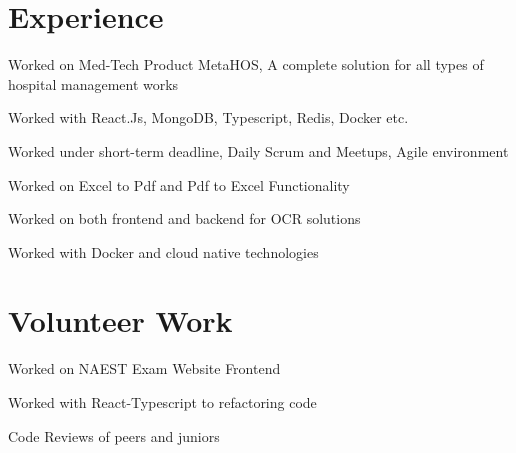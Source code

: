 \documentclass[]{deedy-resume-openfont}
\begin{document}
\begin{minipage}[t]{0.66\textwidth} 


\section{Experience}

\vspace{\topsep} 
\begin{tightemize}
\item Worked on Med-Tech Product MetaHOS, A complete solution for all types of hospital management works
\item Worked with React.Js, MongoDB, Typescript, Redis, Docker etc.
\item Worked under short-term deadline, Daily Scrum and Meetups, Agile environment
\end{tightemize}
\sectionsep

\vspace{\topsep}
\begin{tightemize}
\item Worked on Excel to Pdf and Pdf to Excel Functionality
\item Worked on both frontend and backend for OCR solutions
\item Worked with Docker and cloud native technologies
\end{tightemize}
\sectionsep


\section{Volunteer Work}
\vspace{\topsep} %
\begin{tightemize}
\item Worked on NAEST Exam Website Frontend
\item Worked with React-Typescript to refactoring code
\item Code Reviews of peers and juniors
\end{tightemize}
\sectionsep


\end{minipage}
\end{document}
